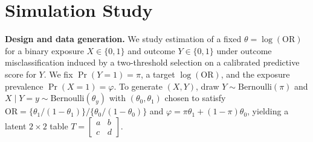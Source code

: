 \documentclass[pdflatex,sn-mathphys-num]{sn-jnl}%
\newcommand{\SPOR}{\textrm{$\lambda$-OR}}
\theoremstyle{thmstyleone}%
\theoremstyle{thmstyletwo}%
\theoremstyle{thmstylethree}%
\begin{document}
\section{Simulation Study}

\textbf{Design and data generation.}
We study estimation of a fixed $\theta=\log(\mathrm{OR})$ for a binary exposure $X\in\{0,1\}$ and outcome $Y\in\{0,1\}$ under outcome misclassification induced by a two-threshold selection on a calibrated predictive score for $Y$. We fix $\Pr(Y{=}1)=\pi$, a target $\log(\mathrm{OR})$, and the exposure prevalence $\Pr(X{=}1)=\varphi$. To generate $(X,Y)$, draw $Y\sim\mathrm{Bernoulli}(\pi)$ and $X\mid Y{=}y\sim\mathrm{Bernoulli}(\theta_y)$ with $(\theta_0,\theta_1)$ chosen to satisfy $\mathrm{OR}=\{\theta_1/(1-\theta_1)\}/\{\theta_0/(1-\theta_0)\}$ and $\varphi=\pi\theta_1+(1-\pi)\theta_0$, yielding a latent $2\times2$ table $T=\begin{bmatrix}a&b\\ c&d\end{bmatrix}$.
\end{document}
